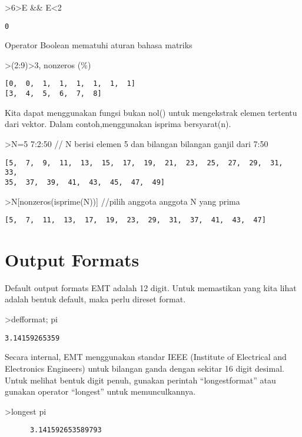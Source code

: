 \documentclass[
]{book}
\begin{document}
\textgreater6\textgreater E \&\& E\textless2

\begin{verbatim}
0
\end{verbatim}

Operator Boolean mematuhi aturan bahasa matriks

\textgreater(2:9)\textgreater3, nonzeros (\%)

\begin{verbatim}
[0,  0,  1,  1,  1,  1,  1,  1]
[3,  4,  5,  6,  7,  8]
\end{verbatim}

Kita dapat menggunakan fungsi bukan nol() untuk mengekstrak elemen tertentu dari vektor. Dalam contoh,menggunakan isprima bersyarat(n).

\textgreater N=5 \textbar{} 7:2:50 // N berisi elemen 5 dan bilangan bilangan ganjil dari 7:50

\begin{verbatim}
[5,  7,  9,  11,  13,  15,  17,  19,  21,  23,  25,  27,  29,  31,  33,
35,  37,  39,  41,  43,  45,  47,  49]
\end{verbatim}

\textgreater N{[}nonzeros(isprime(N)){]} //pilih anggota anggota N yang prima

\begin{verbatim}
[5,  7,  11,  13,  17,  19,  23,  29,  31,  37,  41,  43,  47]
\end{verbatim}

\section{Output Formats}\label{output-formats}

Default output formats EMT adalah 12 digit. Untuk memastikan yang kita lihat adalah bentuk default, maka perlu direset format.

\textgreater defformat; pi

\begin{verbatim}
3.14159265359
\end{verbatim}

Secara internal, EMT menggunakan standar IEEE (Institute of Electrical and Electronics Engineers) untuk bilangan ganda dengan sekitar 16 digit desimal. Untuk melihat bentuk digit penuh, gunakan perintah ``longestformat'' atau gunakan operator ``longest'' untuk memunculkannya.

\textgreater longest pi

\begin{verbatim}
      3.141592653589793 
\end{verbatim}
\end{document}
